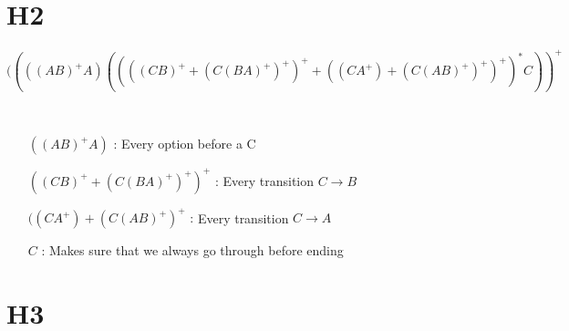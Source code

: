 \documentclass[a4paper, 11pt]{article}
\begin{document}
    \section{H2}
    \begin{description}[leftmargin=\dimexpr 26pt+.55in]
        \item[Solution:] $((((AB)^+A)((((CB)^++(C(BA)^+)^+)^++((CA^+)+(C(AB)^+)^+)^+)^*C))^+$
        \item[Explanation:] ~
            \begin{itemize}[leftmargin=\dimexpr 26pt+.5in]
                \item[$((AB)^+A)$ :] Every option before a C
                \item[$((CB)^++(C(BA)^+)^+)^+$ :] Every transition $C \rightarrow B$
                \item[$((CA^+)+(C(AB)^+)^+$ :] Every transition $C \rightarrow A$
                \item[$C$ :] Makes sure that we always go through before ending
            \end{itemize}
    \end{description}
    \newpage
    
    \section{H3}
    
    
    
\end{document}
